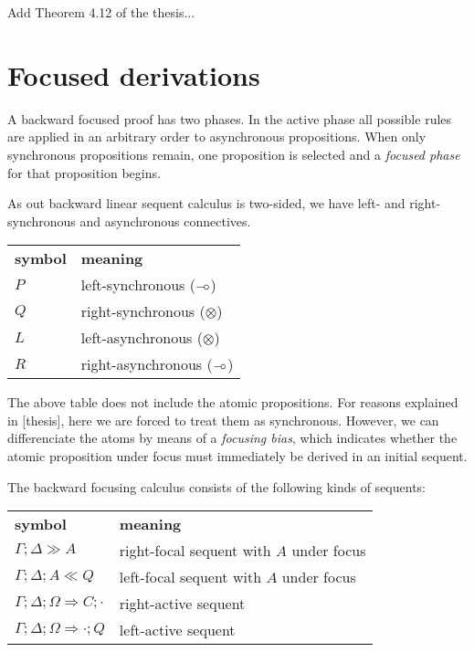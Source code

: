 \documentclass{article}
\def\limp {\mathbin{{-}\mkern-3.5mu{\circ}}}
\begin{document}
Add Theorem 4.12 of the thesis...

\section{Focused derivations}

A backward focused proof has two phases. In the active phase all possible rules
are applied in an arbitrary order to asynchronous propositions. When only
synchronous propositions remain, one proposition is selected and a \emph{focused
  phase} for that proposition begins.

As out backward linear sequent calculus is two-sided, we have left- and right-
synchronous and asynchronous connectives.

\begin{table}[h]
  \centering
  \begin{tabular}{|l|l|}
    \hline
    \textbf{symbol} & \textbf{meaning} \\
    $P$ & left-synchronous ($\limp$) \\
    $Q$ & right-synchronous ($\otimes$) \\
    $L$ & left-asynchronous ($\otimes$) \\
    $R$ & right-asynchronous ($\limp$)
  \end{tabular}
\end{table}

The above table does not include the atomic propositions. For reasons explained
in [thesis], here we are forced to treat them as synchronous. However, we can
differenciate the atoms by means of a \emph{focusing bias}, which indicates
whether the atomic proposition under focus must immediately be derived in an
initial sequent.

The backward focusing calculus consists of the following kinds of sequents:

\begin{table}[h]
  \centering
  \begin{tabular}{ll}
    \hline
    \textbf{symbol} & \textbf{meaning} \\
    $\Gamma; \Delta \gg A$ & right-focal sequent with $A$ under focus \\
    $\Gamma; \Delta; A \ll Q$ & left-focal sequent with $A$ under focus \\
    $\Gamma; \Delta; \Omega \Longrightarrow C; \cdot$ & right-active sequent \\
    $\Gamma; \Delta; \Omega \Longrightarrow \cdot; Q$ & left-active sequent
  \end{tabular}
\end{table}
\end{document}
